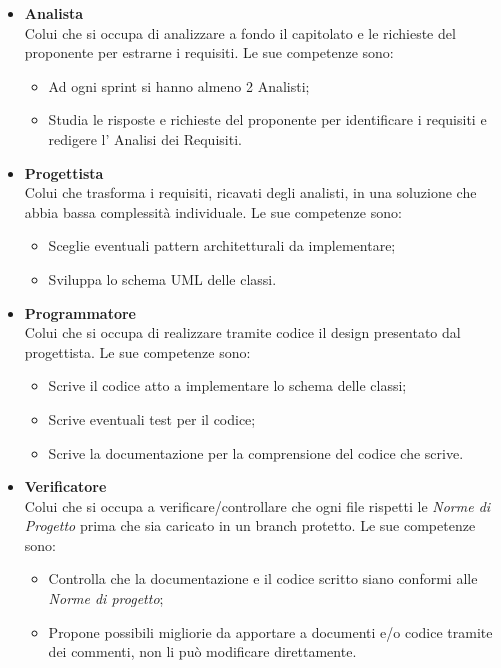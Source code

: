 \begin{itemize}
                    \item \textbf{Analista}\\
                    Colui che si occupa di analizzare a fondo il capitolato e le richieste del proponente per estrarne i requisiti.
                    Le sue competenze sono:
                    \begin{itemize}
                        \item Ad ogni sprint si hanno almeno 2 Analisti;
                        \item Studia le risposte e richieste del proponente per identificare i requisiti e redigere l' Analisi dei Requisiti.
                    \end{itemize}
                    \item \textbf{Progettista}\\
                    Colui che trasforma i requisiti, ricavati degli analisti, in una soluzione che abbia bassa complessità individuale.
                    Le sue competenze sono:
                    \begin{itemize}
                        \item Sceglie eventuali pattern architetturali da implementare;
                        \item Sviluppa lo schema UML delle classi.
                    \end{itemize}
                    \item \textbf{Programmatore}\\
                    Colui che si occupa di realizzare tramite codice il design presentato dal progettista.
                    Le sue competenze sono:
                    \begin{itemize}
                        \item Scrive il codice atto a implementare lo schema delle classi;
                        \item Scrive eventuali test per il codice;
                        \item Scrive la documentazione per la comprensione del codice che scrive.
                    \end{itemize}
                    \item \textbf{Verificatore}\\
                    Colui che si occupa a verificare/controllare che ogni file rispetti le \textit{Norme di Progetto} prima che sia caricato in un branch protetto.
                    Le sue competenze sono:
                    \begin{itemize}
                        \item Controlla che la documentazione e il codice scritto siano conformi alle \textit{Norme di progetto};
                        \item Propone possibili migliorie da apportare a documenti e/o codice tramite dei commenti, non li può modificare direttamente.
                    \end{itemize}
            \end{itemize}

